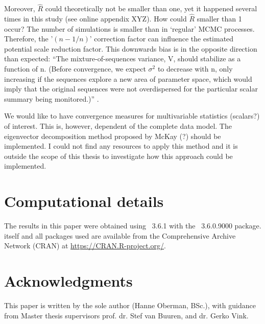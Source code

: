 \documentclass[article]{jss}
\begin{document}
Moreover, $\widehat{R}$ could theoretically not be smaller than one, yet it happened several times in this study (see online appendix XYZ). How could $\widehat{R}$ smaller than 1 occur? The number of simulations is smaller than in `regular' MCMC processes. Therefore, the '$(n-1/n)$' correction factor can influence the estimated potential scale reduction factor. This downwards bias is in the opposite direction than expected: ``The mixture-of-sequences variance, V, should stabilize as a function of n. (Before convergence, we expect $\sigma^2$ to decrease with n, only increasing if the sequences explore a new area of parameter space, which would imply that the original sequences were not overdispersed for the particular scalar summary being monitored.)'' \cite[p~438]{broo98}.

We would like to have convergence measures for multivariable statistics (scalars?) of interest. This is, however, dependent of the complete data model. The eigenvector decomposition method proposed by McKay (?) should be implemented. I could not find any resources to apply this method and it is outside the scope of this thesis to investigate how this approach could be implemented.



\section*{Computational details}

The results in this paper were obtained using ~3.6.1 with the ~3.6.0.9000 package.  itself and all packages used are available from the Comprehensive  Archive Network (CRAN) at \url{https://CRAN.R-project.org/}.


\section*{Acknowledgments}

This paper is written by the sole author (Hanne Oberman, BSc.), with guidance from Master thesis supervisors prof. dr. Stef van Buuren, and dr. Gerko Vink.

\end{document}
